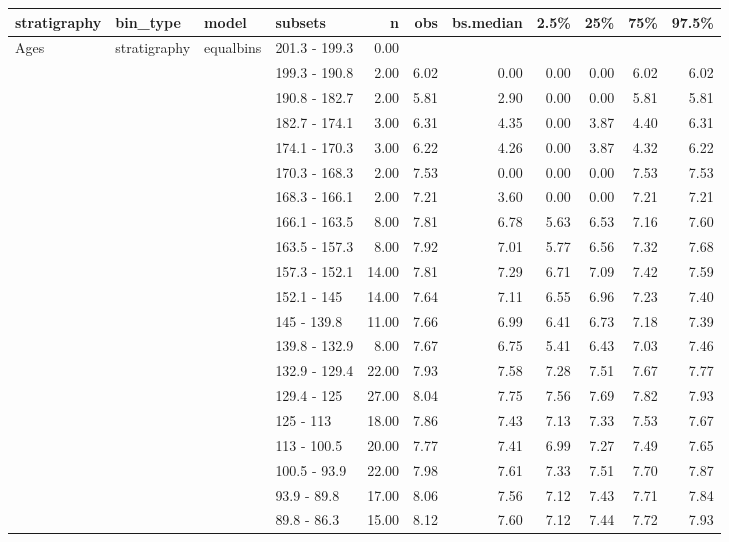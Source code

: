\begin{longtable}{llllrrrrrrr}
  \hline
stratigraphy & bin\_type & model & subsets & n & obs & bs.median & 2.5\% & 25\% & 75\% & 97.5\% \\ 
  \hline
Ages & stratigraphy & equalbins & 201.3 - 199.3 & 0.00 &  &  &  &  &  &  \\ 
   &  &  & 199.3 - 190.8 & 2.00 & 6.02 & 0.00 & 0.00 & 0.00 & 6.02 & 6.02 \\ 
   &  &  & 190.8 - 182.7 & 2.00 & 5.81 & 2.90 & 0.00 & 0.00 & 5.81 & 5.81 \\ 
   &  &  & 182.7 - 174.1 & 3.00 & 6.31 & 4.35 & 0.00 & 3.87 & 4.40 & 6.31 \\ 
   &  &  & 174.1 - 170.3 & 3.00 & 6.22 & 4.26 & 0.00 & 3.87 & 4.32 & 6.22 \\ 
   &  &  & 170.3 - 168.3 & 2.00 & 7.53 & 0.00 & 0.00 & 0.00 & 7.53 & 7.53 \\ 
   &  &  & 168.3 - 166.1 & 2.00 & 7.21 & 3.60 & 0.00 & 0.00 & 7.21 & 7.21 \\ 
   &  &  & 166.1 - 163.5 & 8.00 & 7.81 & 6.78 & 5.63 & 6.53 & 7.16 & 7.60 \\ 
   &  &  & 163.5 - 157.3 & 8.00 & 7.92 & 7.01 & 5.77 & 6.56 & 7.32 & 7.68 \\ 
   &  &  & 157.3 - 152.1 & 14.00 & 7.81 & 7.29 & 6.71 & 7.09 & 7.42 & 7.59 \\ 
   &  &  & 152.1 - 145 & 14.00 & 7.64 & 7.11 & 6.55 & 6.96 & 7.23 & 7.40 \\ 
   &  &  & 145 - 139.8 & 11.00 & 7.66 & 6.99 & 6.41 & 6.73 & 7.18 & 7.39 \\ 
   &  &  & 139.8 - 132.9 & 8.00 & 7.67 & 6.75 & 5.41 & 6.43 & 7.03 & 7.46 \\ 
   &  &  & 132.9 - 129.4 & 22.00 & 7.93 & 7.58 & 7.28 & 7.51 & 7.67 & 7.77 \\ 
   &  &  & 129.4 - 125 & 27.00 & 8.04 & 7.75 & 7.56 & 7.69 & 7.82 & 7.93 \\ 
   &  &  & 125 - 113 & 18.00 & 7.86 & 7.43 & 7.13 & 7.33 & 7.53 & 7.67 \\ 
   &  &  & 113 - 100.5 & 20.00 & 7.77 & 7.41 & 6.99 & 7.27 & 7.49 & 7.65 \\ 
   &  &  & 100.5 - 93.9 & 22.00 & 7.98 & 7.61 & 7.33 & 7.51 & 7.70 & 7.87 \\ 
   &  &  & 93.9 - 89.8 & 17.00 & 8.06 & 7.56 & 7.12 & 7.43 & 7.71 & 7.84 \\ 
   &  &  & 89.8 - 86.3 & 15.00 & 8.12 & 7.60 & 7.12 & 7.44 & 7.72 & 7.93 \\ 

\end{longtable}
